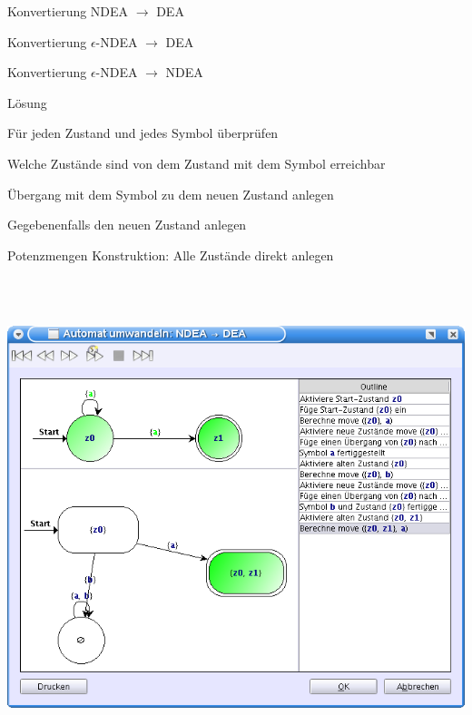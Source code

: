 {
    \begin{itemgroup}{}
	\item Konvertierung NDEA $\to$ DEA
    \item Konvertierung $\epsilon$-NDEA $\to$ DEA
    \item Konvertierung $\epsilon$-NDEA $\to$ NDEA
    \end{itemgroup}

    \begin{itemgroup}{Lösung}
	\item Für jeden Zustand und jedes Symbol überprüfen
	\begin{itemgroup}{}
	  \item Welche Zustände sind von dem Zustand mit dem Symbol erreichbar
	  \item Übergang mit dem Symbol zu dem neuen Zustand anlegen
	  \item Gegebenenfalls den neuen Zustand anlegen
	\end{itemgroup}
	\item Potenzmengen Konstruktion: Alle Zustände direkt anlegen
	\end{itemgroup}
    
    \vfill{}
}


{
  \begin{center}
    \includegraphics[height=14cm]{../images/convert_to.png}
  \end{center}
}



